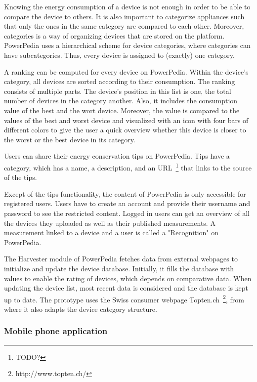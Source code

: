 Knowing the energy consumption of a device is not enough in order to be able to compare the device to others. It is also important to categorize appliances such that only the ones in the same category are compared to each other. Moreover, categories is a way of organizing devices that are stored on the platform. PowerPedia uses a hierarchical scheme for device categories, where categories can have subcategories. Thus, every device is assigned to (exactly) one category. 

 
A ranking can be computed for every device on PowerPedia. Within the device's category, all devices are sorted according to their consumption. The ranking consists of multiple parts. The device's position in this list is one, the total number of devices in the category another. Also, it includes the consumption value of the best and the wort device. Moreover, the value is compared to the values of the best and worst device and visualized with an icon with four bars of different colors to give the user a quick overview whether this device is closer to the worst or the best device in its category. 

Users can share their energy conservation tips on PowerPedia. Tips have a category, which has a name, a description, and an URL~\footnote{TODO?} that links to the source of the tips.
		 
Except of the tips functionality, the content of PowerPedia is only accessible for registered users. Users have to create an account and provide their username and password to see the restricted content. Logged in users can get an overview of all the devices they uploaded as well as their published measurements. A measurement linked to a device and a user is called a "Recognition" on PowerPedia.
  

The Harvester module of PowerPedia fetches data from external webpages to initialize and update the device database. Initially, it fills the database with values to enable the rating of devices, which depends on comparative data. When updating the device list, most recent data is considered and the database is kept up to date. The prototype uses the Swiss consumer webpage Topten.ch~\footnote{http://www.topten.ch/}, from where it also adapts the device category structure. 


\subsubsection{Mobile phone application}

